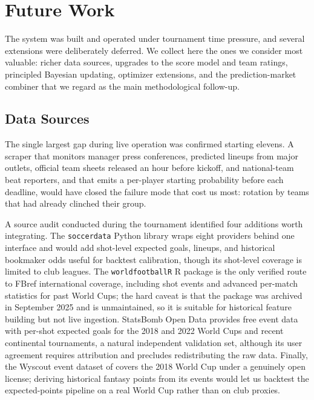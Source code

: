 \section{Future Work}
\label{sec:future_work}

The system was built and operated under tournament time pressure, and
several extensions were deliberately deferred. We collect here the ones
we consider most valuable: richer data sources, upgrades to the score
model and team ratings, principled Bayesian updating, optimizer
extensions, and the prediction-market combiner that we regard as the
main methodological follow-up.

\subsection{Data Sources}
\label{sec:future-data}

The single largest gap during live operation was confirmed starting
elevens. A scraper that monitors manager press conferences, predicted
lineups from major outlets, official team sheets released an hour
before kickoff, and national-team beat reporters, and that emits a
per-player starting probability before each deadline, would have
closed the failure mode that cost us most: rotation by teams that had
already clinched their group.

A source audit conducted during the tournament identified four
additions worth integrating. The \texttt{soccerdata} Python library
wraps eight providers behind one interface and would add shot-level
expected goals, lineups, and historical bookmaker odds useful for
backtest calibration, though its shot-level coverage is limited to
club leagues. The \texttt{worldfootballR} R package is the only
verified route to FBref international coverage, including shot events
and advanced per-match statistics for past World Cups; the hard caveat
is that the package was archived in September 2025 and is unmaintained,
so it is suitable for historical feature building but not live
ingestion. StatsBomb Open Data provides free event data with per-shot
expected goals for the 2018 and 2022 World Cups and recent continental
tournaments, a natural independent validation set, although its user
agreement requires attribution and precludes redistributing the raw
data. Finally, the Wyscout event dataset of
\citet{pappalardo2019public} covers the 2018 World Cup under a
genuinely open license; deriving historical fantasy points from its
events would let us backtest the expected-points pipeline on a real
World Cup rather than on club proxies.

